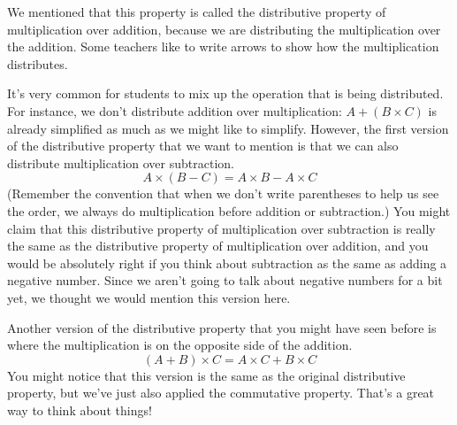 \documentclass{ximera}
\begin{document}
We mentioned that this property is called the distributive property of multiplication over addition, because we are distributing the multiplication over the addition. Some teachers like to write arrows to show how the multiplication distributes.
\begin{center}
\end{center}
It's very common for students to mix up the operation that is being distributed. For instance, we don't distribute addition over multiplication: $A + (B \times C)$ is already simplified as much as we might like to simplify. However, the first version of the distributive property that we want to mention is that we can also distribute multiplication over subtraction.
\[
A \times (B-C) = A \times B - A \times C
\]
(Remember the convention that when we don't write parentheses to help us see the order, we always do multiplication before addition or subtraction.) You might claim that this distributive property of multiplication over subtraction is really the same as the distributive property of multiplication over addition, and you would be absolutely right if you think about subtraction as the same as adding a negative number. Since we aren't going to talk about negative numbers for a bit yet, we thought we would mention this version here.

Another version of the distributive property that you might have seen before is where the multiplication is on the opposite side of the addition.
\[
(A + B) \times C = A \times C + B \times C
\]
You might notice that this version is the same as the original distributive property, but we've just also applied the commutative property. That's a great way to think about things!
\end{document}

